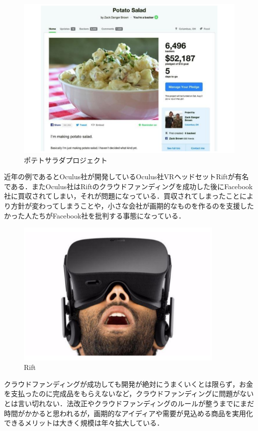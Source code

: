 \begin{figure}[H]
\centering
\includegraphics[width=13cm]{figure45.pdf}
\caption{ポテトサラダプロジェクト}\label{sannp}
\end{figure}

近年の例であるとOculus社が開発しているOculus社VRヘッドセットRiftが有名である．またOculus社はRiftのクラウドファンディングを成功した後にFacebook社に買収されてしまい，それが問題になっている．買収されてしまったことにより方針が変わってしまうことや，小さな会社が画期的なものを作るのを支援したかった人たちがFacebook社を批判する事態になっている．

\begin{figure}[H]
\centering
\includegraphics[width=10cm]{figure44.pdf}
\caption{Rift}\label{sannp}
\end{figure}

クラウドファンディングが成功しても開発が絶対にうまくいくとは限らず，お金を支払ったのに完成品をもらえないなど，クラウドファンディングに問題がないとは言い切れない．法改正やクラウドファンディングのルールが整うまでにまだ時間がかかると思われるが，画期的なアイディアや需要が見込める商品を実用化できるメリットは大きく規模は年々拡大している．

